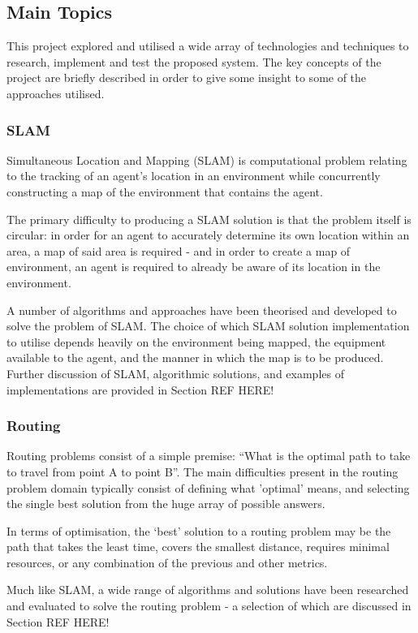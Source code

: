 \subsection{Main Topics}
This project explored and utilised a wide array of technologies and techniques
to research, implement and test the proposed system.
The key concepts of the project are briefly described in order to give some
insight to some of the approaches utilised.

\subsubsection{SLAM}
Simultaneous Location and Mapping (SLAM) is computational problem relating
to the tracking of an agent's location in an environment while concurrently
constructing a map of the environment that contains the agent.

The primary difficulty to producing a SLAM solution is that the problem itself
is circular: in order for an agent to accurately determine its own location
within an area, a map of said area is required - and in order to create a map
of environment, an agent is required to already be aware of its location in the
environment.

A number of algorithms and approaches have been theorised and developed to
solve the problem of SLAM.
The choice of which SLAM solution implementation to utilise depends heavily
on the environment being mapped, the equipment available to the agent, and the
manner in which the map is to be produced.
Further discussion of SLAM, algorithmic solutions, and examples of
implementations are provided in Section REF HERE!


\subsubsection{Routing}
Routing problems consist of a simple premise: ``What is the optimal path to
take to travel from point A to point B''.
The main difficulties present in the routing problem domain typically consist of
defining what 'optimal' means, and selecting the single best solution from the
huge array of possible answers.

In terms of optimisation, the `best' solution to a routing problem may be the
path that takes the least time, covers the smallest distance, requires minimal
resources, or any combination of the previous and other metrics.

Much like SLAM, a wide range of algorithms and solutions have been researched
and evaluated to solve the routing problem - a selection of which are
discussed in Section REF HERE!


